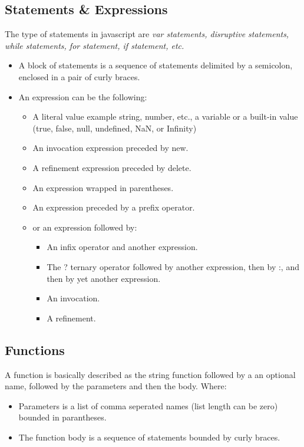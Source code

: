 \documentclass[12pt]{article}
\begin{document}
\subsection{Statements \& Expressions}
The type of statements in javascript are \textit{var statements, disruptive statements, while statements, for statement, if statement, etc.}
\begin{itemize}
\item A block of statements is a sequence of statements delimited by a semicolon, enclosed in a pair of curly braces.
\item An expression can be the following:
\begin{itemize}
\item A literal value example string, number, etc., a variable or a built-in value (true, false, null, undefined, NaN, or Infinity)
\item An invocation expression preceded by new.
\item A refinement expression preceded by delete.
\item An expression wrapped in parentheses.
\item An expression preceded by a prefix operator.
\item or an expression followed by:
\begin{itemize}
\item An infix operator and another expression.
\item The ? ternary operator followed by another expression, then by :, and then by
yet another expression.
\item An invocation.
\item A refinement.
\end{itemize}
\end{itemize}
\end{itemize}
\subsection{Functions}
A function is basically described as the string function followed by a an optional name, followed by the parameters and then the body. Where:
\begin{itemize}
\item Parameters is a list of comma seperated names (list length can be zero) bounded in parantheses.
\item The function body is a sequence of statements bounded by curly braces.
\end{itemize}
\newpage
\end{document}
